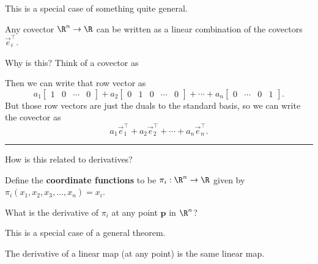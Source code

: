 \documentclass{ximera}
\begin{document}
\begin{question}
  This is a special case of something quite general.
  \begin{theorem}
    Any covector $\R^n \to \R$ can be written as a linear combination of the covectors $\vec{e}_i^\top$.
  \end{theorem}

  Why is this?  Think of a covector as
  \begin{solution}
    \begin{multiple-choice}
    \end{multiple-choice}
  \end{solution}
  Then we can write that row vector as
  $$
  a_1\begin{bmatrix} 1& 0& \cdots &0\end{bmatrix} + a_2\begin{bmatrix} 0& 1&0& \cdots &0\end{bmatrix} 
  + \cdots + a_n \begin{bmatrix} 0&\cdots&0&1\end{bmatrix}.
  $$
  But those row vectors are just the duals to the standard basis, so we can write the covector as
  $$
  a_1 \vec{e}_1^\top + a_2 \vec{e}_2^\top + \cdots + a_n \vec{e}_n^\top.
  $$

  \hrule

  How is this related to derivatives?

  Define the \textbf{coordinate functions} to be $\pi_i:\R^n \to \R$ given by $\pi_i (x_1,x_2,x_3,\ldots,x_n) = x_i$. 
  
  What is the derivative of $\pi_i$ at any point $\mathbf{p}$ in $\R^n$?
  \begin{solution}
    \begin{hint}
      This is a special case of a general theorem.

      \begin{theorem}
        The derivative of a linear map (at any point) is the same linear map.
      \end{theorem}
    \end{hint}


\end{solution}
\end{question}
\end{document}
